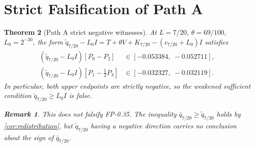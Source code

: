 \documentclass[12pt,a4paper]{amsart}
\theoremstyle{plain}
\newtheorem{theorem}{Theorem}[section]
\theoremstyle{definition}
\newtheorem{remark}[theorem]{Remark}
\newcommand{\qbar}{\bar{q}}
\newcommand{\qtilde}{\tilde{q}}
\newcommand{\Lzero}{L_0}             %
\begin{document}
\section{Strict Falsification of Path A}
\label{sec:falsification}

\begin{theorem}[Path A strict negative witnesses]
\label{thm:path-a-neg}
At $L = 7/20$, $\theta = 69/100$, $\Lzero = 2^{-30}$, the form
$\qtilde_{7/20} - \Lzero I = T + \theta V + K_{7/20} - (c_{7/20}+\Lzero)I$
satisfies
\begin{align*}
  (\qtilde_{7/20} - \Lzero I)[P_0 - P_2]
  &\in [-0.053384,\; -0.052711], \\
  (\qtilde_{7/20} - \Lzero I)[P_1 - \tfrac{1}{2}P_3]
  &\in [-0.032327,\; -0.032119].
\end{align*}
In particular, both upper endpoints are strictly negative, so the weakened
sufficient condition $\qtilde_{7/20} \ge \Lzero I$ is \emph{false}.

\begin{remark}
This does not falsify FP-0.35.
The inequality $\qbar_{7/20} \ge \qtilde_{7/20}$ holds by
\cref{cor:redistribution}, but $\qtilde_{7/20}$ having a negative direction
carries no conclusion about the sign of $\qbar_{7/20}$.
\end{remark}
\end{theorem}
\end{document}
